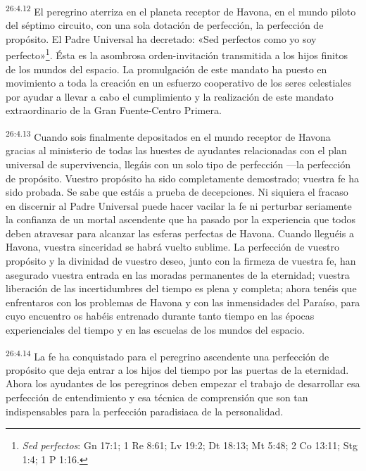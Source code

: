 \par
\textsuperscript{26:4.12} El peregrino aterriza en el planeta receptor de Havona, en el mundo piloto del séptimo circuito, con una sola dotación de perfección, la perfección de propósito. El Padre Universal ha decretado: «Sed perfectos como yo soy perfecto»\footnote{\textit{Sed perfectos}: Gn 17:1; 1 Re 8:61; Lv 19:2; Dt 18:13; Mt 5:48; 2 Co 13:11; Stg 1:4; 1 P 1:16.}. Ésta es la asombrosa orden-invitación transmitida a los hijos finitos de los mundos del espacio. La promulgación de este mandato ha puesto en movimiento a toda la creación en un esfuerzo cooperativo de los seres celestiales por ayudar a llevar a cabo el cumplimiento y la realización de este mandato extraordinario de la Gran Fuente-Centro Primera.

\par
\textsuperscript{26:4.13} Cuando sois finalmente depositados en el mundo receptor de Havona gracias al ministerio de todas las huestes de ayudantes relacionadas con el plan universal de supervivencia, llegáis con un solo tipo de perfección ---la perfección de propósito. Vuestro propósito ha sido completamente demostrado; vuestra fe ha sido probada. Se sabe que estáis a prueba de decepciones. Ni siquiera el fracaso en discernir al Padre Universal puede hacer vacilar la fe ni perturbar seriamente la confianza de un mortal ascendente que ha pasado por la experiencia que todos deben atravesar para alcanzar las esferas perfectas de Havona. Cuando lleguéis a Havona, vuestra sinceridad se habrá vuelto sublime. La perfección de vuestro propósito y la divinidad de vuestro deseo, junto con la firmeza de vuestra fe, han asegurado vuestra entrada en las moradas permanentes de la eternidad; vuestra liberación de las incertidumbres del tiempo es plena y completa; ahora tenéis que enfrentaros con los problemas de Havona y con las inmensidades del Paraíso, para cuyo encuentro os habéis entrenado durante tanto tiempo en las épocas experienciales del tiempo y en las escuelas de los mundos del espacio.

\par
\textsuperscript{26:4.14} La fe ha conquistado para el peregrino ascendente una perfección de propósito que deja entrar a los hijos del tiempo por las puertas de la eternidad. Ahora los ayudantes de los peregrinos deben empezar el trabajo de desarrollar esa perfección de entendimiento y esa técnica de comprensión que son tan indispensables para la perfección paradisiaca de la personalidad.

